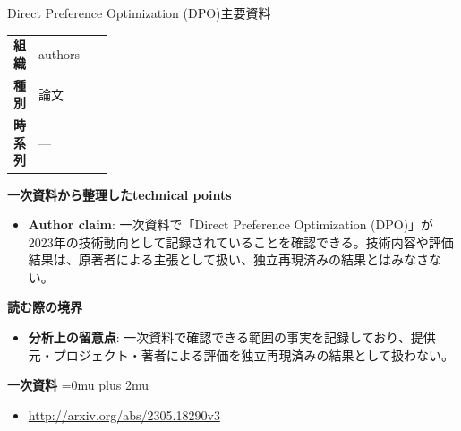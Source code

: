 \begin{technicalnote}{Direct Preference Optimization (DPO)}{主要資料}
\begingroup
\begin{tabularx}{\linewidth}{@{}>{\bfseries}p{0.22\linewidth}X@{}}
組織 & authors \\
種別 & 論文 \\
時系列 & — \\
\end{tabularx}
\smallskip
{\bfseries 一次資料から整理したtechnical points}
\begin{itemize}[leftmargin=1.5em,itemsep=0.35em]
\item \textbf{Author claim}: 一次資料で「Direct Preference Optimization (DPO)」が2023年の技術動向として記録されていることを確認できる。技術内容や評価結果は、原著者による主張として扱い、独立再現済みの結果とはみなさない。
\end{itemize}
\begin{minipage}{\linewidth}
{\bfseries 読む際の境界}
\begin{itemize}[leftmargin=1.5em,itemsep=0.35em]
\item \textbf{分析上の留意点}: 一次資料で確認できる範囲の事実を記録しており、提供元・プロジェクト・著者による評価を独立再現済みの結果として扱わない。
\end{itemize}
\begin{samepage}
{\bfseries 一次資料}
\begingroup\sloppy
\Urlmuskip=0mu plus 2mu\relax
\begin{itemize}[leftmargin=1.5em,itemsep=0.25em]
\item {\scriptsize\url{http://arxiv.org/abs/2305.18290v3}}
\end{itemize}
\endgroup
\end{samepage}
\end{minipage}
\endgroup
\end{technicalnote}
\medskip


